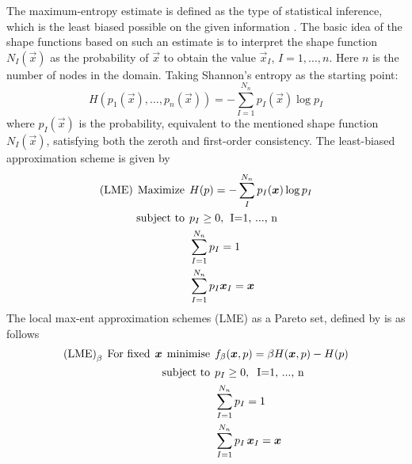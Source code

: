 The maximum-entropy estimate is defined as the type of statistical
inference, which is the least biased possible on the given information
\cite{Jaynes1957}. The basic idea of the shape functions based on such
an estimate is to interpret the shape function $N_I(\vec{x})$ as the
probability of $\vec{x}$ to obtain the value $\vec{x}_I$,  $I=1,
\dots, n$. Here $n$ is the number of nodes in the domain.
Taking Shannon's entropy as the starting point:
\begin{equation}
  \label{eq:Shannon-entropy}
  H(p_1(\vec{x}),\ldots,p_n(\vec{x})) = -\sum^{N_n}_{I=1}{p_I(\vec{x})\log p_I }
\end{equation}
where $p_I(\vec{x})$ is the probability, equivalent to the mentioned
shape function $N_I(\vec{x})$,  satisfying both the zeroth and
first-order consistency. The least-biased approximation scheme is given by
\begin{align*}
  \text{(LME)} \hspace{0.15cm} \text{Maximize} \hspace{0.15cm} &H(p) = -\sum_{I}^{N_n}{p_I(\vec{x})\log p_I } \nonumber \\
  \text{subject to} \hspace{0.15cm} &p_I \ge 0, \hspace{0.15cm} \text{I=1, ..., n} \nonumber \\
  &\sum_{I=1}^{N_n}{p_I} = 1 \nonumber \\
  &\sum_{I=1}^{N_n}{p_I \vec{x}_I} = \vec{x} \nonumber 
\end{align*}
The local max-ent approximation schemes (LME) as a Pareto set,
defined by \cite{Arroyo2006} is as follows 
\begin{align*}
  \text{(LME)}_{\beta} \hspace{0.15cm} \text{For fixed} \hspace{0.15cm}
  \vec{x} \hspace{0.15cm} \text{minimise}  \nonumber \hspace{0.15cm} &f_{\beta}(\vec{x}, p) = \beta H(\vec{x},p) - H(p) \\
  \text{subject to} \hspace{0.15cm} &p_I \ge 0, \hspace{0.2cm} \text{I=1, ..., n}  \\
                                                                   &\sum_{I=1}^{N_n}{p_I} = 1 \\
                                                                   &\sum_{I=1}^{N_n}{p_I \, \vec{x}_I} = \vec{x}
\end{align*}
